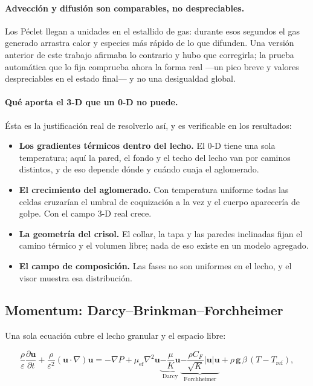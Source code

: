 \paragraph{Advección y difusión son comparables, no despreciables.} Los Péclet
llegan a unidades en el estallido de gas: durante esos segundos el gas generado
arrastra calor y especies más rápido de lo que difunden. Una versión anterior de
este trabajo afirmaba lo contrario y hubo que corregirla; la prueba automática
que lo fija comprueba ahora la forma real ---un pico breve y valores
despreciables en el estado final--- y no una desigualdad global.

\paragraph{Qué aporta el 3-D que un 0-D no puede.} Ésta es la justificación real
de resolverlo así, y es verificable en los resultados:

\begin{itemize}[leftmargin=*,itemsep=2pt]
\item \textbf{Los gradientes térmicos dentro del lecho.} El 0-D tiene una sola
temperatura; aquí la pared, el fondo y el techo del lecho van por caminos
distintos, y de eso depende dónde y cuándo cuaja el aglomerado.
\item \textbf{El crecimiento del aglomerado.} Con temperatura uniforme todas las
celdas cruzarían el umbral de coquización a la vez y el cuerpo aparecería de
golpe. Con el campo 3-D real crece.
\item \textbf{La geometría del crisol.} El collar, la tapa y las paredes
inclinadas fijan el camino térmico y el volumen libre; nada de eso existe en un
modelo agregado.
\item \textbf{El campo de composición.} Las fases no son uniformes en el lecho,
y el visor muestra esa distribución.
\end{itemize}

\subsection{Momentum: Darcy--Brinkman--Forchheimer}

Una sola ecuación cubre el lecho granular y el espacio libre:

\begin{equation}
\frac{\rho}{\varepsilon}\frac{\partial \mathbf{u}}{\partial t}
+ \frac{\rho}{\varepsilon^{2}}(\mathbf{u}\cdot\nabla)\mathbf{u}
= -\nabla P
+ \mu_{\mathrm{ef}}\nabla^{2}\mathbf{u}
\underbrace{- \frac{\mu}{K}\mathbf{u}}_{\text{Darcy}}
\underbrace{- \frac{\rho C_F}{\sqrt{K}}|\mathbf{u}|\mathbf{u}}_{\text{Forchheimer}}
+ \rho\,\mathbf{g}\,\beta\,(T-T_{\mathrm{ref}}),
\label{eq:momentum}
\end{equation}

